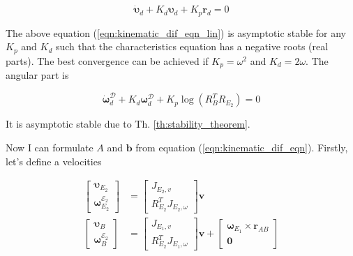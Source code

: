 \begin{equation}
    \dot{\boldsymbol{\upsilon}}_d + K_d \boldsymbol{\upsilon}_d + K_p \mathbf{r}_d = 0
    \label{eqn:kinematic_dif_eqn_lin}
\end{equation}

The above equation (\ref{eqn:kinematic_dif_eqn_lin}) is asymptotic stable for any 
$K_p$ and $K_d$ such that the characteristics equation has a negative roots 
(real parts). The best convergence can be achieved if $K_p = \omega^2$ and 
$K_d = 2 \omega$. The angular part is 

\begin{equation}
    \dot{\boldsymbol{\omega}}_d^{\mathcal{D}} + 
    K_d \boldsymbol{\omega}_d^{\mathcal{D}} + 
    K_p \log (R_B^T R_{E_2}) = 0
    \label{eqn:kinematic_dif_eqn_ang}
\end{equation}

It is asymptotic stable due to Th. \ref{th:stability_theorem}.

Now I can formulate $A$ and $\mathbf{b}$ from equation (\ref{eqn:kinematic_dif_eqn}). 
Firstly, let's define a velocities

\begin{equation}
    \begin{aligned}
        \begin{bmatrix}
            \boldsymbol{\upsilon}_{E_2} \\
            \boldsymbol{\omega}_{E_2}^{\mathcal{E}_2}
        \end{bmatrix} & = 
        \begin{bmatrix}
            J_{E_2, v} \\
            R_{E_2}^T J_{E_2, \omega}
        \end{bmatrix}
        \mathbf{v} \\
        \begin{bmatrix}
            \boldsymbol{\upsilon}_B \\
            \boldsymbol{\omega}_{B}^{\mathcal{E}_2} 
        \end{bmatrix} & = 
        \begin{bmatrix}
            J_{E_1, v} \\
            R_{E_2}^T J_{E_1, \omega}
        \end{bmatrix}
        \mathbf{v} +
        \begin{bmatrix}
            \boldsymbol{\omega}_{E_1} \times \mathbf{r}_{AB} \\
            \mathbf{0}
        \end{bmatrix}
    \end{aligned}
    \label{eqn:velocities_from_q}
\end{equation}


